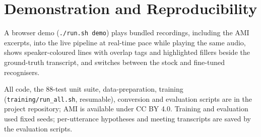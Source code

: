 \documentclass[conference]{IEEEtran}
\begin{document}
\section*{Demonstration and Reproducibility}
A browser demo (\texttt{./run.sh demo}) plays bundled recordings, including the AMI excerpts, into the live pipeline at real-time pace while playing the same audio, shows speaker-coloured lines with overlap tags and highlighted fillers beside the ground-truth transcript, and switches between the stock and fine-tuned recognisers.

All code, the 88-test unit suite, data-preparation, training (\texttt{training/run\_all.sh}, resumable), conversion and evaluation scripts are in the project repository; AMI is available under CC BY 4.0. Training and evaluation used fixed seeds; per-utterance hypotheses and meeting transcripts are saved by the evaluation scripts.




\end{document}
